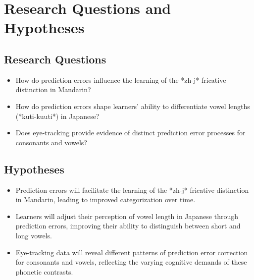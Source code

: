 \section{Research Questions and Hypotheses}

\subsection{Research Questions}

\begin{itemize}
    \item How do prediction errors influence the learning of the *zh-j* fricative distinction in Mandarin?
    \item How do prediction errors shape learners' ability to differentiate vowel lengths (*kuti-kuuti*) in Japanese?
    \item Does eye-tracking provide evidence of distinct prediction error processes for consonants and vowels?
\end{itemize}

\subsection{Hypotheses}

\begin{itemize}
    \item Prediction errors will facilitate the learning of the *zh-j* fricative distinction in Mandarin, leading to improved categorization over time.
    \item Learners will adjust their perception of vowel length in Japanese through prediction errors, improving their ability to distinguish between short and long vowels.
    \item Eye-tracking data will reveal different patterns of prediction error correction for consonants and vowels, reflecting the varying cognitive demands of these phonetic contrasts.
\end{itemize}